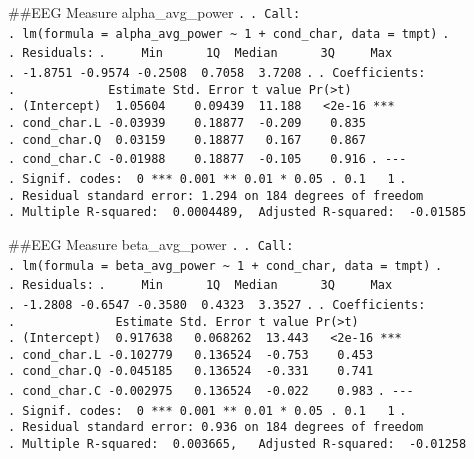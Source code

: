 \documentclass[
]{article}
\begin{document}
\#\#EEG Measure alpha\_avg\_power \texttt{.} \texttt{.\ Call:}
\texttt{.\ lm(formula\ =\ alpha\_avg\_power\ \textasciitilde{}\ 1\ +\ cond\_char,\ data\ =\ tmpt)}
\texttt{.} \texttt{.\ Residuals:}
\texttt{.\ \ \ \ \ Min\ \ \ \ \ \ 1Q\ \ Median\ \ \ \ \ \ 3Q\ \ \ \ \ Max}
\texttt{.\ -1.8751\ -0.9574\ -0.2508\ \ 0.7058\ \ 3.7208} \texttt{.}
\texttt{.\ Coefficients:}
\texttt{.\ \ \ \ \ \ \ \ \ \ \ \ \ Estimate\ Std.\ Error\ t\ value\ Pr(\textgreater{}\textbar{}t\textbar{})}
\texttt{.\ (Intercept)\ \ 1.05604\ \ \ \ 0.09439\ \ 11.188\ \ \ \textless{}2e-16\ ***}
\texttt{.\ cond\_char.L\ -0.03939\ \ \ \ 0.18877\ \ -0.209\ \ \ \ 0.835}
\texttt{.\ cond\_char.Q\ \ 0.03159\ \ \ \ 0.18877\ \ \ 0.167\ \ \ \ 0.867}
\texttt{.\ cond\_char.C\ -0.01988\ \ \ \ 0.18877\ \ -0.105\ \ \ \ 0.916}
\texttt{.\ -\/-\/-}
\texttt{.\ Signif.\ codes:\ \ 0\ \textquotesingle{}***\textquotesingle{}\ 0.001\ \textquotesingle{}**\textquotesingle{}\ 0.01\ \textquotesingle{}*\textquotesingle{}\ 0.05\ \textquotesingle{}.\textquotesingle{}\ 0.1\ \textquotesingle{}\ \textquotesingle{}\ 1}
\texttt{.}
\texttt{.\ Residual\ standard\ error:\ 1.294\ on\ 184\ degrees\ of\ freedom}
\texttt{.\ Multiple\ R-squared:\ \ 0.0004489,\ \ Adjusted\ R-squared:\ \ -0.01585}

\#\#EEG Measure beta\_avg\_power \texttt{.} \texttt{.\ Call:}
\texttt{.\ lm(formula\ =\ beta\_avg\_power\ \textasciitilde{}\ 1\ +\ cond\_char,\ data\ =\ tmpt)}
\texttt{.} \texttt{.\ Residuals:}
\texttt{.\ \ \ \ \ Min\ \ \ \ \ \ 1Q\ \ Median\ \ \ \ \ \ 3Q\ \ \ \ \ Max}
\texttt{.\ -1.2808\ -0.6547\ -0.3580\ \ 0.4323\ \ 3.3527} \texttt{.}
\texttt{.\ Coefficients:}
\texttt{.\ \ \ \ \ \ \ \ \ \ \ \ \ \ Estimate\ Std.\ Error\ t\ value\ Pr(\textgreater{}\textbar{}t\textbar{})}
\texttt{.\ (Intercept)\ \ 0.917638\ \ \ 0.068262\ \ 13.443\ \ \ \textless{}2e-16\ ***}
\texttt{.\ cond\_char.L\ -0.102779\ \ \ 0.136524\ \ -0.753\ \ \ \ 0.453}
\texttt{.\ cond\_char.Q\ -0.045185\ \ \ 0.136524\ \ -0.331\ \ \ \ 0.741}
\texttt{.\ cond\_char.C\ -0.002975\ \ \ 0.136524\ \ -0.022\ \ \ \ 0.983}
\texttt{.\ -\/-\/-}
\texttt{.\ Signif.\ codes:\ \ 0\ \textquotesingle{}***\textquotesingle{}\ 0.001\ \textquotesingle{}**\textquotesingle{}\ 0.01\ \textquotesingle{}*\textquotesingle{}\ 0.05\ \textquotesingle{}.\textquotesingle{}\ 0.1\ \textquotesingle{}\ \textquotesingle{}\ 1}
\texttt{.}
\texttt{.\ Residual\ standard\ error:\ 0.936\ on\ 184\ degrees\ of\ freedom}
\texttt{.\ Multiple\ R-squared:\ \ 0.003665,\ \ \ Adjusted\ R-squared:\ \ -0.01258}
\end{document}
